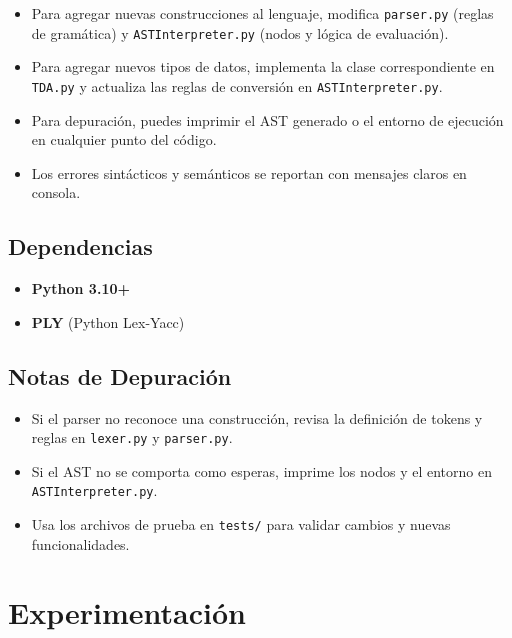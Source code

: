 \documentclass{article}
\begin{document}
\begin{itemize}
    \item Para agregar nuevas construcciones al lenguaje, modifica \texttt{parser.py} (reglas de gramática) y \texttt{ASTInterpreter.py} (nodos y lógica de evaluación).
    \item Para agregar nuevos tipos de datos, implementa la clase correspondiente en \texttt{TDA.py} y actualiza las reglas de conversión en \texttt{ASTInterpreter.py}.
    \item Para depuración, puedes imprimir el AST generado o el entorno de ejecución en cualquier punto del código.
    \item Los errores sintácticos y semánticos se reportan con mensajes claros en consola.
\end{itemize}

\subsection{Dependencias}

\begin{itemize}
    \item \textbf{Python 3.10+}
    \item \textbf{PLY} (Python Lex-Yacc)
\end{itemize}

\subsection{Notas de Depuración}

\begin{itemize}
    \item Si el parser no reconoce una construcción, revisa la definición de tokens y reglas en \texttt{lexer.py} y \texttt{parser.py}.
    \item Si el AST no se comporta como esperas, imprime los nodos y el entorno en \texttt{ASTInterpreter.py}.
    \item Usa los archivos de prueba en \texttt{tests/} para validar cambios y nuevas funcionalidades.
\end{itemize}



\section{Experimentación}\label{sec:exp}
\end{document}
